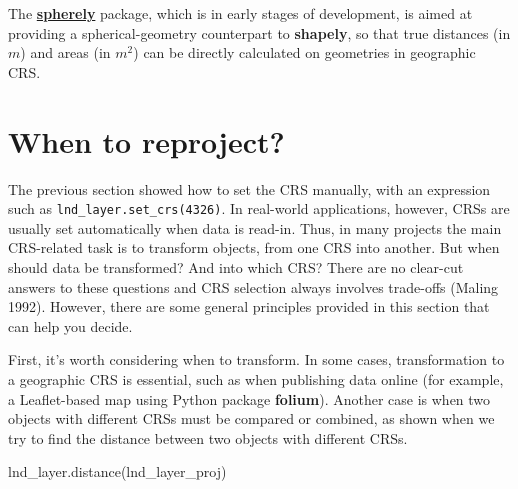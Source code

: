 \documentclass[
  letterpaper,
]{krantz}
\newenvironment{Shaded}{\begin{snugshade}}{\end{snugshade}}
\newcommand{\NormalTok}[1]{\textcolor[rgb]{0.00,0.23,0.31}{#1}}
\begin{document}
\begin{tcolorbox}[enhanced jigsaw, coltitle=black, colback=white, opacitybacktitle=0.6, rightrule=.15mm, titlerule=0mm, colbacktitle=quarto-callout-note-color!10!white, colframe=quarto-callout-note-color-frame, title=\textcolor{quarto-callout-note-color}{\faInfo}\hspace{0.5em}{Note}, left=2mm, breakable, arc=.35mm, bottomtitle=1mm, toptitle=1mm, bottomrule=.15mm, opacityback=0, leftrule=.75mm, toprule=.15mm]

The \href{https://github.com/benbovy/spherely}{\textbf{spherely}}
package, which is in early stages of development, is aimed at providing
a spherical-geometry counterpart to \textbf{shapely}, so that true
distances (in \(m\)) and areas (in \(m^2\)) can be directly calculated
on geometries in geographic CRS.

\end{tcolorbox}

\section{When to reproject?}\label{sec-when-to-reproject}

The previous section showed how to set the CRS manually, with an
expression such as \texttt{lnd\_layer.set\_crs(4326)}. In real-world
applications, however, CRSs are usually set automatically when data is
read-in. Thus, in many projects the main CRS-related task is to
transform objects, from one CRS into another. But when should data be
transformed? And into which CRS? There are no clear-cut answers to these
questions and CRS selection always involves trade-offs (Maling 1992).
However, there are some general principles provided in this section that
can help you decide.

First, it's worth considering when to transform. In some cases,
transformation to a geographic CRS is essential, such as when publishing
data online (for example, a Leaflet-based map using Python package
\textbf{folium}). Another case is when two objects with different CRSs
must be compared or combined, as shown when we try to find the distance
between two objects with different CRSs.

\begin{Shaded}
\begin{Highlighting}[]
\NormalTok{lnd\_layer.distance(lnd\_layer\_proj)}
\end{Highlighting}
\end{Shaded}
\end{document}
